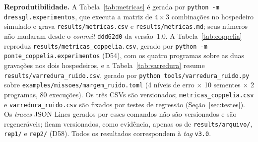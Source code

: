 \documentclass[conference]{IEEEtran}
\begin{document}
\textbf{Reprodutibilidade.} A Tabela~\ref{tab:metricas} é gerada por
\texttt{python -m dressgl.experimentos}, que executa a matriz de $4 \times 3$
combinações no hospedeiro simulado e grava \texttt{results/metricas.csv} e
\texttt{results/metricas.md}; seus números não mudaram desde o \textit{commit}
\texttt{ddd62d0} da versão~1.0. A Tabela~\ref{tab:coppelia} reproduz
\texttt{results/metricas\_coppelia.csv}, gerado por
\texttt{python -m ponte\_coppelia.experimentos} (D54), com os quatro programas sobre as duas
gravações nos dois hospedeiros, e a Tabela~\ref{tab:varredura} resume
\texttt{results/varredura\_ruido.csv}, gerado por
\texttt{python tools/varredura\_ruido.py} sobre
\texttt{examples/missoes/margem\_ruido.toml} (4 níveis de erro $\times$ 10
sementes $\times$ 2 programas, 80 execuções). Os três CSVs são versionados;
\texttt{metricas\_coppelia.csv} e \texttt{varredura\_ruido.csv} são fixados por
testes de regressão (Seção~\ref{sec:testes}). Os \textit{traces} JSON Lines
gerados por esses comandos não são versionados e são regeneráveis; ficam
versionados, como evidência, apenas os de \texttt{results/arquivo/},
\texttt{rep1/} e \texttt{rep2/} (D58). Todos
os resultados correspondem à \textit{tag} \texttt{v3.0}.
\end{document}

